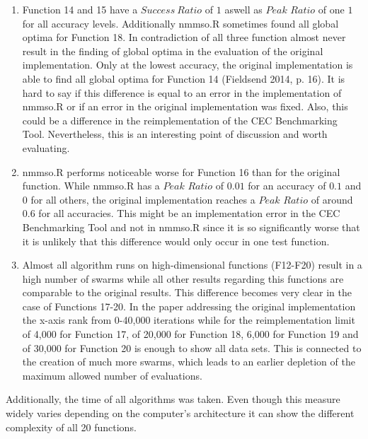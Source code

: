 \documentclass[12pt,a4paper]{article}
\begin{document}
\begin{enumerate}
\def\labelenumi{(\arabic{enumi})}
\item
  Function 14 and 15 have a \(Success\ Ratio\) of \(1\) aswell as
  \(Peak\) \(Ratio\) of one \(1\) for all accuracy levels. Additionally
  nmmso.R sometimes found all global optima for Function 18. In
  contradiction of all three function almost never result in the finding
  of global optima in the evaluation of the original implementation.
  Only at the lowest accuracy, the original implementation is able to
  find all global optima for Function 14 (Fieldsend 2014, p. 16). It is
  hard to say if this difference is equal to an error in the
  implementation of nmmso.R or if an error in the original
  implementation was fixed. Also, this could be a difference in the
  reimplementation of the CEC Benchmarking Tool. Nevertheless, this is
  an interesting point of discussion and worth evaluating.
\item
  nmmso.R performs noticeable worse for Function 16 than for the
  original function. While nmmso.R has a \(Peak\) \(Ratio\) of \(0.01\)
  for an accuracy of \(0.1\) and \(0\) for all others, the original
  implementation reaches a \(Peak\) \(Ratio\) of around \(0.6\) for all
  accuracies. This might be an implementation error in the CEC
  Benchmarking Tool and not in nmmso.R since it is so significantly
  worse that it is unlikely that this difference would only occur in one
  test function.
\item
  Almost all algorithm runs on high-dimensional functions (F12-F20)
  result in a high number of swarms while all other results regarding
  this functions are comparable to the original results. This difference
  becomes very clear in the case of Functions 17-20. In the paper
  addressing the original implementation the x-axis rank from 0-40,000
  iterations while for the reimplementation limit of 4,000 for Function
  17, of 20,000 for Function 18, 6,000 for Function 19 and of 30,000 for
  Function 20 is enough to show all data sets. This is connected to the
  creation of much more swarms, which leads to an earlier depletion of
  the maximum allowed number of evaluations.
\end{enumerate}

Additionally, the time of all algorithms was taken. Even though this
measure widely varies depending on the computer's architecture it can
show the different complexity of all 20 functions.
\end{document}
